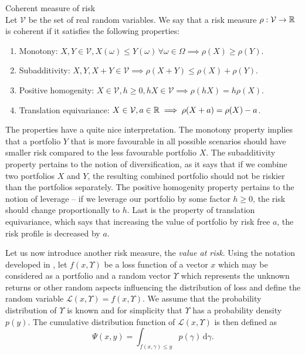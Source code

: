\begin{defn}{Coherent measure of risk} \\
Let $\mathcal{V}$ be the set of real random variables. We say that a risk measure $\rho: \mathcal{V} \rightarrow \mathbb{R}$ is coherent if it satisfies the following properties:
\begin{enumerate}
	\item Monotony: $X, Y \in \mathcal{V}, X(\omega) \leq Y(\omega) \, \forall \omega \in \Omega \implies \rho(X) \geq \rho(Y)$.
	\item Subadditivity: $X, Y, X+Y \in \mathcal{V} \implies \rho(X+	Y) \leq \rho(X) + \rho(Y)$.
	\item Positive homogenity: $X \in \mathcal{V}, h \geq 0, hX \in \mathcal{V} \implies \rho(hX)=h\rho(X)$.
	\item Translation equivariance: $X \in \mathcal{V}, a \in \mathbb{R} \implies \rho(X+a)=\rho(X)-a$.
\end{enumerate}
\end{defn}
The properties have a quite nice interpretation. The monotony property implies that a portfolio $Y$ that is more favourable in all possible scenarios should have smaller risk compared to the less favourable portfolio $X$. The subadditivity property pertains to the notion of diversification, as it says that if we combine two portfolios $X$ and $Y$, the resulting combined portfolio should not be riskier than the portfolios separately. The positive homogenity property pertains to the notion of leverage -- if we leverage our portfolio by some factor $h\geq0$, the risk should change proportionally to $h$. Last is the property of translation equivariance, which says that increasing the value of portfolio by risk free $a$, the risk profile is decreased by $a$. 

Let us now introduce another risk measure, the \textit{value at risk}.
Using the notation developed in \cite{cornuejols_tutuncu_2006}, let $f(x,\Upsilon)$ be a loss function of a vector $x$ which may be considered as a portfolio and a random vector $\Upsilon$ which represents the unknown returns or other random aspects influencing the distribution of loss and define the random variable $\mathcal{L}(x,\Upsilon)=f(x,\Upsilon)$. We assume that the probability distribution of $\Upsilon$ is known and for simplicity that $\Upsilon$ has a probability density $p(y)$. The cumulative distribution function of $\mathcal{L}(x,\Upsilon)$ is then defined as
\begin{equation*}
\Psi(x,y)=\int_{f(x,\gamma) \leq y} p(\gamma) \, \mathrm{d}\gamma.
\end{equation*}

